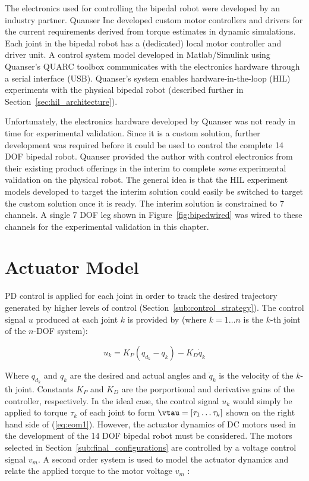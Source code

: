 The electronics used for controlling the bipedal robot were developed by an industry partner. Quanser Inc developed custom motor controllers and drivers for the current requirements derived from torque estimates in dynamic simulations. Each joint in the bipedal robot has a (dedicated) local motor controller and driver unit. A control system model developed in Matlab/Simulink using Quanser's QUARC toolbox communicates with the electronics hardware through a serial interface (USB). Quanser's system enables hardware-in-the-loop (HIL) experiments with the physical bipedal robot (described further in Section~\ref{sec:hil_architecture}).    

Unfortunately, the electronics hardware developed by Quanser was not ready in time for experimental validation. Since it is a custom solution, further development was required before it could be used to control the complete 14 DOF bipedal robot. Quanser provided the author with control electronics from their existing product offerings in the interim to complete \emph{some} experimental validation on the physical robot. The general idea is that the HIL experiment models developed to target the interim solution could easily be switched to target the custom solution once it is ready. The interim solution is constrained to 7 channels. A single 7 DOF leg shown in Figure~\ref{fig:bipedwired} was wired to these channels for the experimental validation in this chapter. 



\section{Actuator Model} %
\label{sec:actuator_model}
PD control is applied for each joint in order to track the desired trajectory generated by higher levels of control (Section~\ref{sub:control_strategy}). The control signal $u$ produced at each joint $k$ is provided by (where $k = 1 \ldots n$ is the $k$-th joint of the $n$-DOF system): 

\begin{equation}
	{u_k} = {K_P}({q_{d_k}} - {q_k}) - {K_D}{\dot q_k}
	\label{eq:pdcontrollaw}
\end{equation} 

Where ${q_{d_k}}$ and ${q_k}$ are the desired and actual angles and ${\dot q_k}$ is the velocity of the $k$-th joint. Constants ${K_P}$ and ${K_D}$ are the porportional and derivative gains of the controller, respectively. In the ideal case, the control signal ${u_k}$ would simply be applied to torque ${\tau _k}$ of each joint to form $\vtau = \left[\tau _1 \ldots \tau _k \right]$ shown on the right hand side of (\ref{eq:eom1}). However, the actuator dynamics of DC motors used in the development of the 14 DOF bipedal robot must be considered. The motors selected in Section~\ref{sub:final_configurations} are controlled by a voltage control signal $v_{m}$. A second order system is used to model the actuator dynamics and relate the applied torque to the motor voltage $v _m$ \cite{Spong2008}: 

